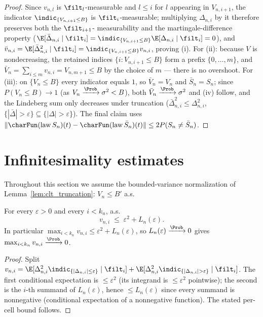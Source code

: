 \begin{proof}\leanok
Since $v_{n,l}$ is $\filt_l$-measurable and $l\le i$ for $l$ appearing in
$V_{n,i+1}$, the indicator $\indic_{\{V_{n,i+1}\le B\}}$ is $\filt_i$-measurable;
multiplying $\Delta_{n,i}$ by it therefore preserves both the $\filt_{i+1}$-%
measurability and the martingale-difference property
($\E[\bar\Delta_{n,i}\mid\filt_i]=\indic_{\{V_{n,i+1}\le B\}}\E[\Delta_{n,i}\mid\filt_i]=0$),
and $\bar v_{n,i}=\E[\bar\Delta_{n,i}^2\mid\filt_i]=\indic_{\{V_{n,i+1}\le B\}}v_{n,i}$,
proving (i). For (ii): because $V$ is nondecreasing, the retained indices
$\{i:V_{n,i+1}\le B\}$ form a prefix $\{0,\dots,m\}$, and
$\bar V_n=\sum_{i\le m}v_{n,i}=V_{n,m+1}\le B$ by the choice of $m$ --- there is no
overshoot. For (iii): on $\{V_n\le B\}$ every indicator equals $1$, so $\bar
V_n=V_n$ and $\bar S_n=S_n$; since $P(V_n\le B)\to1$ (as
$V_n\xrightarrow{\Prob}\sigma^2<B$), both $\bar V_n\xrightarrow{\Prob}\sigma^2$ and
(iv) follow, and the Lindeberg sum only decreases under truncation
($\bar\Delta_{n,i}^2\le\Delta_{n,i}^2$, $\{|\bar\Delta|>\varepsilon\}\subseteq\{|\Delta|>\varepsilon\}$).
The final claim uses
$\|\charFun(\mathrm{law}\,S_n)(t)-\charFun(\mathrm{law}\,\bar S_n)(t)\|\le
2P(S_n\ne\bar S_n)$.
\end{proof}

\section{Infinitesimality estimates}
\label{sec:pre_clt_infl}

Throughout this section we assume the bounded-variance normalization of
Lemma~\ref{lem:clt_truncation}: $V_n\le B'$ a.s.

\begin{lemma}\label{lem:clt_max_var}
\leanok
For every $\varepsilon>0$ and every $i<k_n$, a.s.
\[
  v_{n,i}\;\le\;\varepsilon^2 + L_n(\varepsilon).
\]
In particular $\max_{i<k_n} v_{n,i}\le\varepsilon^2 + L_n(\varepsilon)$, so
$L_n(\varepsilon)\xrightarrow{\Prob}0$ gives $\max_{i<k_n}v_{n,i}\xrightarrow{\Prob}0$.
\end{lemma}

\begin{proof}\leanok
Split $v_{n,i}=\E[\Delta_{n,i}^2\indic_{\{|\Delta_{n,i}|\le\varepsilon\}}\mid\filt_i]
+\E[\Delta_{n,i}^2\indic_{\{|\Delta_{n,i}|>\varepsilon\}}\mid\filt_i]$. The first
conditional expectation is $\le\varepsilon^2$ (its integrand is $\le\varepsilon^2$
pointwise); the second is the $i$-th summand of $L_n(\varepsilon)$, hence
$\le L_n(\varepsilon)$ since every summand is nonnegative (conditional expectation
of a nonnegative function). The stated per-cell bound follows.
\end{proof}

